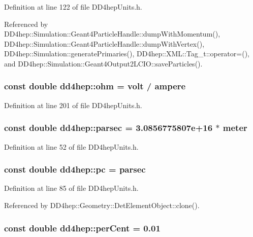Definition at line 122 of file DD4hepUnits.h.

Referenced by DD4hep::Simulation::Geant4ParticleHandle::dumpWithMomentum(), DD4hep::Simulation::Geant4ParticleHandle::dumpWithVertex(), DD4hep::Simulation::generatePrimaries(), DD4hep::XML::Tag\_\-t::operator=(), and DD4hep::Simulation::Geant4Output2LCIO::saveParticles().\hypertarget{namespacedd4hep_a4a6ac9823f6701bcc4c42d5221f272b6}{
\subsubsection[{ohm}]{\setlength{\rightskip}{0pt plus 5cm}const double {\bf dd4hep::ohm} = {\bf volt} / {\bf ampere}}}
\label{namespacedd4hep_a4a6ac9823f6701bcc4c42d5221f272b6}


Definition at line 201 of file DD4hepUnits.h.\hypertarget{namespacedd4hep_a6d097c8b8fee88c7f77ebdfe2923ac45}{
\subsubsection[{parsec}]{\setlength{\rightskip}{0pt plus 5cm}const double {\bf dd4hep::parsec} = 3.0856775807e+16 $\ast$ meter}}
\label{namespacedd4hep_a6d097c8b8fee88c7f77ebdfe2923ac45}


Definition at line 52 of file DD4hepUnits.h.\hypertarget{namespacedd4hep_a463cd79bb27007361a510abb0d10665d}{
\subsubsection[{pc}]{\setlength{\rightskip}{0pt plus 5cm}const double {\bf dd4hep::pc} = {\bf parsec}}}
\label{namespacedd4hep_a463cd79bb27007361a510abb0d10665d}


Definition at line 85 of file DD4hepUnits.h.

Referenced by DD4hep::Geometry::DetElementObject::clone().\hypertarget{namespacedd4hep_a403b2fd7b19ff0bf0a3803d7907bf84a}{
\subsubsection[{perCent}]{\setlength{\rightskip}{0pt plus 5cm}const double {\bf dd4hep::perCent} = 0.01}}
\label{namespacedd4hep_a403b2fd7b19ff0bf0a3803d7907bf84a}


